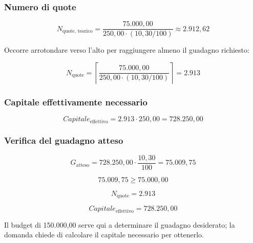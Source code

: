 \subsubsection*{Numero di quote}

\[
    N_{\text{quote, teorico}}
    =
    \frac{75.000{,}00}
    {250{,}00\cdot(10{,}30/100)}
    \approx2.912{,}62
\]

\noindent Occorre arrotondare verso l'alto per raggiungere
almeno il guadagno richiesto:

\[
    N_{\text{quote}}
    =
    \left\lceil
        \frac{75.000{,}00}
        {250{,}00\cdot(10{,}30/100)}
    \right\rceil
    =
    2.913
\]

\subsubsection*{Capitale effettivamente necessario}

\[
    Capitale_{\text{effettivo}}
    =
    2.913\cdot250{,}00
    =
    728.250{,}00
\]

\subsubsection*{Verifica del guadagno atteso}

\[
    G_{\text{atteso}}
    =
    728.250{,}00\cdot\frac{10{,}30}{100}
    =
    75.009{,}75
\]

\[
    75.009{,}75\geq75.000{,}00
\]

\[
    \boxed{N_{\text{quote}}=2.913}
\]

\[
    \boxed{Capitale_{\text{effettivo}}=728.250{,}00}
\]

\noindent Il budget di 150.000,00 serve qui a determinare
il guadagno desiderato; la domanda chiede di calcolare
il capitale necessario per ottenerlo.

\newpage
